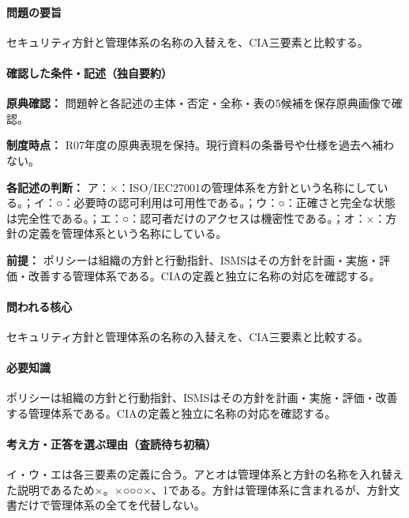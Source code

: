 \paragraph{問題の要旨} セキュリティ方針と管理体系の名称の入替えを、CIA三要素と比較する。

\paragraph{確認した条件・記述（独自要約）}\mbox{}\par

\noindent\textbf{原典確認：} 問題幹と各記述の主体・否定・全称・表の5候補を保存原典画像で確認。\par

\noindent\textbf{制度時点：} R07年度の原典表現を保持。現行資料の条番号や仕様を過去へ補わない。\par

\noindent\textbf{各記述の判断：} ア：×：ISO/IEC27001の管理体系を方針という名称にしている。；イ：○：必要時の認可利用は可用性である。；ウ：○：正確さと完全な状態は完全性である。；エ：○：認可者だけのアクセスは機密性である。；オ：×：方針の定義を管理体系という名称にしている。\par

\noindent\textbf{前提：} ポリシーは組織の方針と行動指針、ISMSはその方針を計画・実施・評価・改善する管理体系である。CIAの定義と独立に名称の対応を確認する。\par

\paragraph{問われる核心} セキュリティ方針と管理体系の名称の入替えを、CIA三要素と比較する。

\paragraph{必要知識} ポリシーは組織の方針と行動指針、ISMSはその方針を計画・実施・評価・改善する管理体系である。CIAの定義と独立に名称の対応を確認する。

\paragraph{考え方・正答を選ぶ理由（査読待ち初稿）} イ・ウ・エは各三要素の定義に合う。アとオは管理体系と方針の名称を入れ替えた説明であるため×。×○○○×、1である。方針は管理体系に含まれるが、方針文書だけで管理体系の全てを代替しない。

